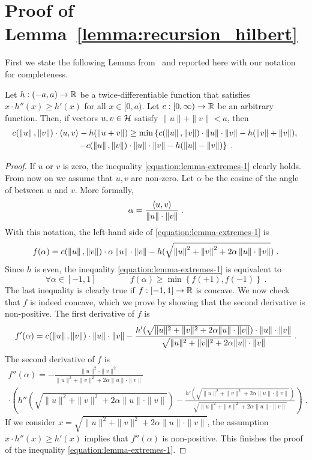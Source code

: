\section{Proof of Lemma~\ref{lemma:recursion_hilbert}}
\label{section:hilbert-space-reduction}

First we state the following Lemma from~\cite{McMahanO14} and reported here with
our notation for completeness.

\begin{lemma}[Extremes]
\label{lemma:extremes}
Let $h:(-a,a) \to \mathbb{R}$ be a twice-differentiable function that
satisfies $x \cdot h''(x) \ge h'(x)$ for all $x \in [0,a)$. Let $c:[0,\infty) \to \mathbb{R}$
be an arbitrary function. Then, if vectors $u,v \in \mathcal{H}$ satisfy $\|u\| + \|v\| < a$, then
\begin{multline}
\label{equation:lemma-extremes-1}
c(\left\|{u}\right\|, \left\|{v}\right\|) \cdot \langle u, v \rangle - h(\left\|{u+v}\right\|)
\ge \min \left\{ c(\left\|{u}\right\|, \left\|{v}\right\|) \cdot \left\|{u}\right\| \cdot \left\|{v}\right\| - h(\left\|{v}\right\| + \left\|{v}\right\|), \right. \\
\left. - c(\left\|{u}\right\|, \left\|{v}\right\|) \cdot \left\|{u}\right\| \cdot \left\|{v}\right\| - h(\left\|{u}\right\| - \left\|{v}\right\|) \right\} \; .
\end{multline}
\end{lemma}
%
\begin{proof}
If $u$ or $v$ is zero, the inequality \eqref{equation:lemma-extremes-1} clearly
holds. From now on we assume that $u,v$ are non-zero. Let $\alpha$ be the cosine
of the angle of between $u$ and $v$. More formally,
$$
\alpha = \frac{\langle u, v \rangle}{\left\|{u}\right\| \cdot \left\|{v}\right\|} \; .
$$
With this notation, the left-hand side of \eqref{equation:lemma-extremes-1} is
$$
f(\alpha) = c(\left\|{u}\right\|, \left\|{v}\right\|) \cdot \alpha \left\|{u}\right\| \cdot \left\|{v}\right\| - h(\sqrt{\left\|{u}\right\|^2 + \left\|{v}\right\|^2 + 2 \alpha \left\|{u}\right\| \cdot \left\|{v}\right\|}) \; .
$$
Since $h$ is even, the inequality \eqref{equation:lemma-extremes-1} is equivalent to
$$
\forall \alpha \in [-1,1] \qquad \qquad f(\alpha) \ge \min \left\{f(+1), f(-1)\right\} \; .
$$
The last inequality is clearly true if $f:[-1,1] \to \mathbb{R}$ is concave. We now
check that $f$ is indeed concave, which we prove by showing that the second
derivative is non-positive. The first derivative of $f$ is
$$
f'(\alpha) = c(\left\|{u}\right\|, \left\|{v}\right\|) \cdot \|u\| \cdot \|v\| - \frac{h'(\sqrt{\|u\|^2 + \|v\|^2 + 2 \alpha \|u\| \cdot \|v\|}) \cdot \|u\| \cdot \|v\|}{\sqrt{\|u\|^2 + \|v\|^2 + 2 \alpha \|u\| \cdot \|v\|}} \; .
$$
The second derivative of $f$ is
\begin{multline*}
f''(\alpha) = - \frac{\|u\|^2 \cdot \|v\|^2}{\|u\|^2 + \|v\|^2 + 2 \alpha \|u\| \cdot \|v\|} \\
 \cdot \left( h''(\sqrt{\|u\|^2 + \|v\|^2 + 2 \alpha \|u\| \cdot \|v\|})  - \frac{h'(\sqrt{\|u\|^2 + \|v\|^2 + 2 \alpha \|u\| \cdot \|v\|})}{\sqrt{\|u\|^2 + \|v\|^2 + 2\alpha \|u\| \cdot \|v\|}}  \right) \; .
\end{multline*}
If we consider $x = \sqrt{\|u\|^2 + \|v\|^2 + 2 \alpha \|u\| \cdot \|v\|}$, the
assumption $x \cdot h''(x) \ge h'(x)$ implies that $f''(\alpha)$ is non-positive.
This finishes the proof of the inequality \eqref{equation:lemma-extremes-1}.
\end{proof}

